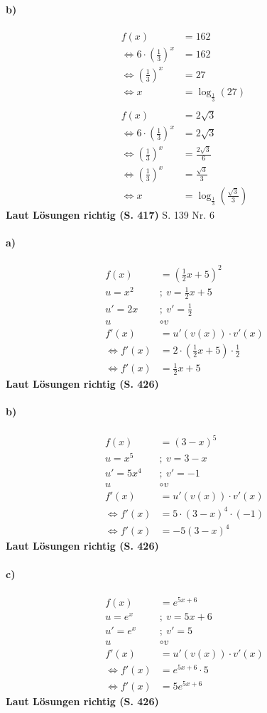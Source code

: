 \documentclass[12pt,a4paper]{report}
\newcommand{\richtig}[1]{\color{ForestGreen}\textbf{
	Laut Lösungen richtig (S. #1)
}\color{black}}
\begin{document}
	\paragraph{b)}
	\begin{align*}
		f(x) &= 162 \\
		\Leftrightarrow 6 \cdot (\frac{1}{3})^x &= 162 \\
		\Leftrightarrow (\frac{1}{3})^x &= 27 \\
		\Leftrightarrow x &= \log_{\frac{1}{3}}(27) \\
		\\
		f(x) &= 2\sqrt{3} \\
		\Leftrightarrow 6 \cdot (\frac{1}{3})^x &= 2\sqrt{3} \\
		\Leftrightarrow (\frac{1}{3})^x &= \frac{2\sqrt{3}}{6} \\
		\Leftrightarrow (\frac{1}{3})^x &= \frac{\sqrt{3}}{3} \\
		\Leftrightarrow x &= \log_{\frac{1}{3}}(\frac{\sqrt{3}}{3})
	\end{align*}
	\richtig{417}
	\newpage
	\noindent
	\Large S. 139 Nr. 6
	\large
	\paragraph{a)}
	\begin{align*}
		f(x) &= (\frac{1}{2}x + 5)^2 \\
		u = x^2&;\ v=\frac{1}{2}x + 5\\
		u' = 2x&;\ v'=\frac{1}{2} \\
		u&\circ v\\
		f'(x) &= u'(v(x)) \cdot v'(x) \\
		\Leftrightarrow f'(x) &= 2\cdot (\frac{1}{2}x + 5) \cdot \frac{1}{2} \\
		\Leftrightarrow f'(x) &= \frac{1}{2}x + 5
	\end{align*}
	\richtig{426}
	\paragraph{b)}
	\begin{align*}
		f(x) &= (3-x)^5 \\
		u=x^5&;\ v=3-x\\
		u'=5x^4&;\ v'=-1 \\
		u&\circ v\\
		f'(x) &= u'(v(x)) \cdot v'(x) \\
		\Leftrightarrow f'(x) &= 5 \cdot (3-x)^4 \cdot (-1) \\
		\Leftrightarrow f'(x) &= -5 (3-x)^4
	\end{align*}
	\richtig{426}
	\paragraph{c)}
	\begin{align*}
		f(x) &= e^{5x + 6} \\
		u= e^x&;\ v=5x+6\\
		u'=e^x&;\ v'=5\\
		u&\circ v \\
		f'(x) &= u'(v(x)) \cdot v'(x) \\
		\Leftrightarrow f'(x) &= e^{5x + 6} \cdot 5 \\
		\Leftrightarrow f'(x) &= 5e^{5x + 6}
	\end{align*}
	\richtig{426}
\end{document}
